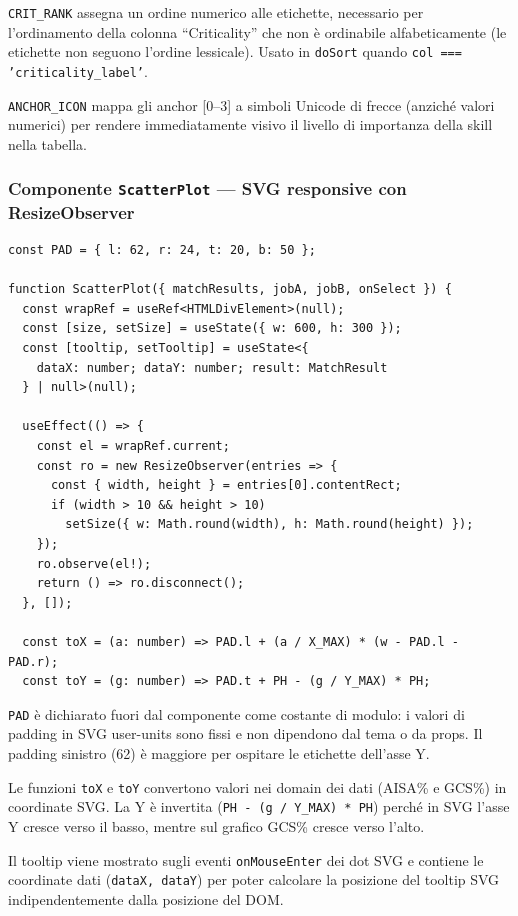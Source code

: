 \documentclass[a4paper,12pt]{article}
\begin{document}
\texttt{CRIT\_RANK} assegna un ordine numerico alle etichette,
necessario per l'ordinamento della colonna ``Criticality'' che non
\`{e} ordinabile alfabeticamente (le etichette non seguono l'ordine
lessicale). Usato in \texttt{doSort} quando \texttt{col === 'criticality\_label'}.

\texttt{ANCHOR\_ICON} mappa gli anchor [0--3] a simboli Unicode di
frecce (anzich\'{e} valori numerici) per rendere immediatamente visivo
il livello di importanza della skill nella tabella.

\subsubsection{Componente \texttt{ScatterPlot} --- SVG responsive con ResizeObserver}

\begin{lstlisting}
const PAD = { l: 62, r: 24, t: 20, b: 50 };

function ScatterPlot({ matchResults, jobA, jobB, onSelect }) {
  const wrapRef = useRef<HTMLDivElement>(null);
  const [size, setSize] = useState({ w: 600, h: 300 });
  const [tooltip, setTooltip] = useState<{
    dataX: number; dataY: number; result: MatchResult
  } | null>(null);

  useEffect(() => {
    const el = wrapRef.current;
    const ro = new ResizeObserver(entries => {
      const { width, height } = entries[0].contentRect;
      if (width > 10 && height > 10)
        setSize({ w: Math.round(width), h: Math.round(height) });
    });
    ro.observe(el!);
    return () => ro.disconnect();
  }, []);

  const toX = (a: number) => PAD.l + (a / X_MAX) * (w - PAD.l - PAD.r);
  const toY = (g: number) => PAD.t + PH - (g / Y_MAX) * PH;
\end{lstlisting}

\noindent \texttt{PAD} \`{e} dichiarato fuori dal componente come costante di
modulo: i valori di padding in SVG user-units sono fissi e non dipendono
dal tema o da props. Il padding sinistro (62) \`{e} maggiore per
ospitare le etichette dell'asse Y.

Le funzioni \texttt{toX} e \texttt{toY} convertono valori nei domain
dei dati (AISA\% e GCS\%) in coordinate SVG. La Y \`{e} invertita
(\texttt{PH - (g / Y\_MAX) * PH}) perch\'{e} in SVG l'asse Y cresce
verso il basso, mentre sul grafico GCS\% cresce verso l'alto.

Il tooltip viene mostrato sugli eventi \texttt{onMouseEnter} dei dot
SVG e contiene le coordinate dati (\texttt{dataX, dataY}) per poter
calcolare la posizione del tooltip SVG indipendentemente dalla posizione
del DOM.
\end{document}
